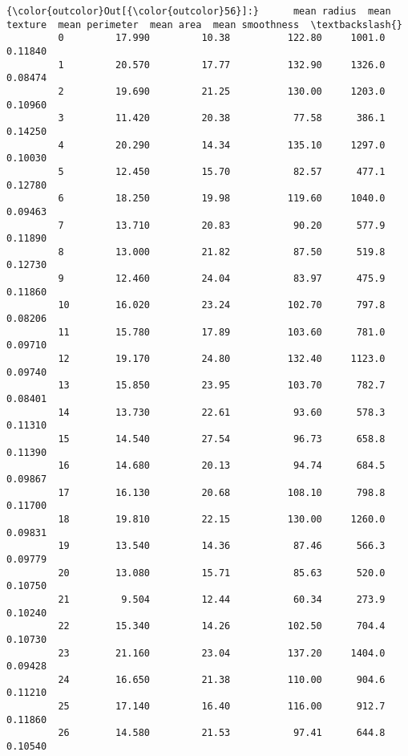 \documentclass[11pt]{article}
\begin{document}
\begin{Verbatim}[commandchars=\\\{\}]
{\color{outcolor}Out[{\color{outcolor}56}]:}      mean radius  mean texture  mean perimeter  mean area  mean smoothness  \textbackslash{}
         0         17.990         10.38          122.80     1001.0          0.11840   
         1         20.570         17.77          132.90     1326.0          0.08474   
         2         19.690         21.25          130.00     1203.0          0.10960   
         3         11.420         20.38           77.58      386.1          0.14250   
         4         20.290         14.34          135.10     1297.0          0.10030   
         5         12.450         15.70           82.57      477.1          0.12780   
         6         18.250         19.98          119.60     1040.0          0.09463   
         7         13.710         20.83           90.20      577.9          0.11890   
         8         13.000         21.82           87.50      519.8          0.12730   
         9         12.460         24.04           83.97      475.9          0.11860   
         10        16.020         23.24          102.70      797.8          0.08206   
         11        15.780         17.89          103.60      781.0          0.09710   
         12        19.170         24.80          132.40     1123.0          0.09740   
         13        15.850         23.95          103.70      782.7          0.08401   
         14        13.730         22.61           93.60      578.3          0.11310   
         15        14.540         27.54           96.73      658.8          0.11390   
         16        14.680         20.13           94.74      684.5          0.09867   
         17        16.130         20.68          108.10      798.8          0.11700   
         18        19.810         22.15          130.00     1260.0          0.09831   
         19        13.540         14.36           87.46      566.3          0.09779   
         20        13.080         15.71           85.63      520.0          0.10750   
         21         9.504         12.44           60.34      273.9          0.10240   
         22        15.340         14.26          102.50      704.4          0.10730   
         23        21.160         23.04          137.20     1404.0          0.09428   
         24        16.650         21.38          110.00      904.6          0.11210   
         25        17.140         16.40          116.00      912.7          0.11860   
         26        14.580         21.53           97.41      644.8          0.10540   

\end{Verbatim}
\end{document}
